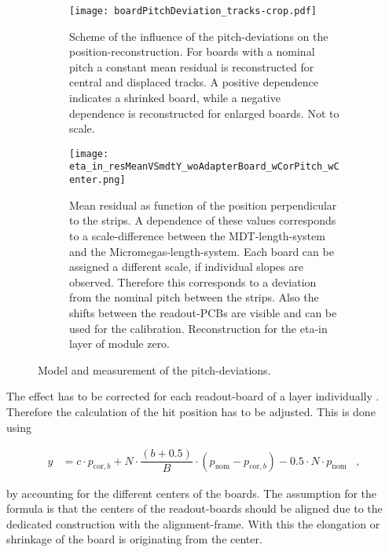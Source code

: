 \documentclass[
twoside,            %
BCOR1.4cm,          %
10pt,               %
headings=normal,    %
headsepline,        %
clearplainpage,		%
final,              %
div=14,
open=right,
bibliography=toc
]{scrreprt}
\begin{document}
\begin{figure}[!h]
	\begin{subfigure}[b]{0.48\textwidth}
		\centering
		\texttt{[image: boardPitchDeviation\_tracks-crop.pdf]}
		\caption{
			Scheme of the influence of the pitch-deviations on the position-reconstruction.
			For boards with a nominal pitch a constant mean residual is reconstructed for central and displaced tracks.
			A positive dependence indicates a shrinked board, while a negative dependence is reconstructed for enlarged boards.
			Not to scale.
		}
		\label{pitchDeviationsScheme} 
	\end{subfigure}
	\hfill
	\begin{subfigure}[b]{0.48\textwidth}
		\centering
		\texttt{[image: eta\_in\_resMeanVSmdtY\_woAdapterBoard\_wCorPitch\_wCenter.png]}
		\caption{
			Mean residual as function of the position perpendicular to the strips.
			A dependence of these values corresponds to a scale-difference between the MDT-length-system and the Micromegas-length-system.
			Each board can be assigned a different scale, if individual slopes are observed.
			Therefore this corresponds to a deviation from the nominal pitch between the strips.
			Also the shifts between the readout-PCBs are visible and can be used for the calibration.
			Reconstruction for the eta-in layer of module zero.
		}
		\label{M0etaInPitchDeviation} 
	\end{subfigure}
	\vspace{-2mm}
	\caption{
		Model and measurement of the pitch-deviations.
	}
\end{figure}

The effect has to be corrected for each readout-board of a layer individually \cite{ICHEPpaper}.
Therefore the calculation of the hit position has to be adjusted.
This is done using

\begin{align}
	y &= 
			c \cdot p_{\mathrm{cor},b} 
			+ N 
			\cdot \dfrac{\left( b + 0.5 \right)}{B} 
			\cdot \left( p_{\mathrm{nom}} - p_{\mathrm{cor},b} \right)
			- 0.5 \cdot N \cdot p_{\mathrm{nom}} \;\;\; ,
	\label{positionBoardPitchAdjustment}
\end{align}

by accounting for the different centers of the boards.
The assumption for the formula is that the centers of the readout-boards should be aligned due to the dedicated construction with the alignment-frame.
With this the elongation or shrinkage of the board is originating from the center.
\end{document}
